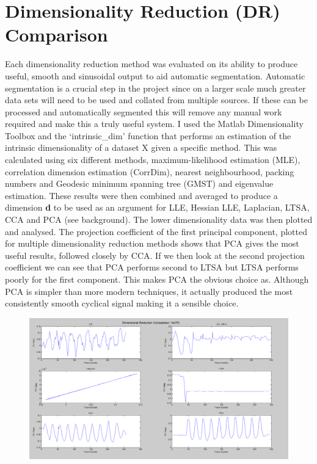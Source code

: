 \section {Dimensionality Reduction (DR) Comparison}
Each dimensionality reduction method was evaluated on its ability to produce useful, smooth and sinusoidal output to aid automatic segmentation. Automatic segmentation is a crucial step in the project since on a larger scale much greater data sets will need to be used and collated from multiple sources. If these can be processed and automatically segmented this will remove any manual work required and make this a truly useful system. I used the Matlab Dimensionality Toolbox and the `intrinsic_dim' function that performs an estimation of the intrinsic dimensionality of a dataset X given a specific method. This was calculated using six different methods, maximum-likelihood estimation (MLE), correlation dimension estimation (CorrDim), nearest neighbourhood, packing numbers and Geodesic minimum spanning tree (GMST) and eigenvalue estimation.
These results were then combined and averaged to produce a dimension {\bf d} to be used as an argument for LLE, Hessian LLE, Laplacian, LTSA, CCA and PCA (see background). The lower dimensionality data was then plotted and analysed.
The projection coefficient of the first principal component, plotted for multiple dimensionality reduction methods shows that PCA gives the most useful results, followed closely by CCA. If we then look at the second projection coefficient we can see that PCA performs second to LTSA but LTSA performs poorly for the first component. This makes PCA the obvious choice as. Although PCA is simpler than more modern techniques, it actually produced the most consistently smooth cyclical signal making it a sensible choice.
\begin{figure}[h!]
    \centering
    \includegraphics[height=0.25\textheight]{fig04/drcomp.pdf}
    \label{fig:drcomp}
\end{figure}
